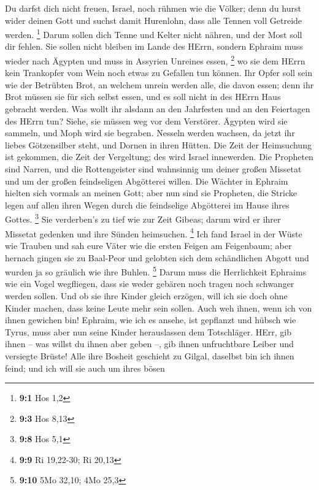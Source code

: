  Du darfst dich nicht freuen, Israel, noch rühmen wie die
Völker; denn du hurst wider deinen Gott und suchst damit Hurenlohn, dass
alle Tennen voll Getreide werden. \footnote{\textbf{9:1} Hos 1,2}
 Darum sollen dich Tenne und Kelter nicht nähren, und der
Most soll dir fehlen.  Sie sollen nicht bleiben im Lande des
HErrn, sondern Ephraim muss wieder nach Ägypten und muss in Assyrien
Unreines essen, \footnote{\textbf{9:3} Hos 8,13}  wo sie dem
HErrn kein Trankopfer vom Wein noch etwas zu Gefallen tun können. Ihr
Opfer soll sein wie der Betrübten Brot, an welchem unrein werden alle,
die davon essen; denn ihr Brot müssen sie für sich selbst essen, und es
soll nicht in des HErrn Haus gebracht werden.  Was wollt ihr
alsdann an den Jahrfesten und an den Feiertagen des HErrn tun?
 Siehe, sie müssen weg vor dem Verstörer. Ägypten wird sie
sammeln, und Moph wird sie begraben. Nesseln werden wachsen, da jetzt
ihr liebes Götzensilber steht, und Dornen in ihren Hütten. 
Die Zeit der Heimsuchung ist gekommen, die Zeit der Vergeltung; des wird
Israel innewerden. Die Propheten sind Narren, und die Rottengeister sind
wahnsinnig um deiner großen Missetat und um der großen feindseligen
Abgötterei willen.  Die Wächter in Ephraim hielten sich
vormals an meinen Gott; aber nun sind sie Propheten, die Stricke legen
auf allen ihren Wegen durch die feindselige Abgötterei im Hause ihres
Gottes. \footnote{\textbf{9:8} Hos 5,1}  Sie verderben's zu
tief wie zur Zeit Gibeas; darum wird er ihrer Missetat gedenken und ihre
Sünden heimsuchen. \footnote{\textbf{9:9} Ri 19,22-30; Ri 20,13}
 Ich fand Israel in der Wüste wie Trauben und sah eure
Väter wie die ersten Feigen am Feigenbaum; aber hernach gingen sie zu
Baal-Peor und gelobten sich dem schändlichen Abgott und wurden ja so
gräulich wie ihre Buhlen. \footnote{\textbf{9:10} 5Mo 32,10; 4Mo 25,3}
 Darum muss die Herrlichkeit Ephraims wie ein Vogel
wegfliegen, dass sie weder gebären noch tragen noch schwanger werden
sollen.  Und ob sie ihre Kinder gleich erzögen, will ich
sie doch ohne Kinder machen, dass keine Leute mehr sein sollen. Auch weh
ihnen, wenn ich von ihnen gewichen bin!  Ephraim, wie ich
es ansehe, ist gepflanzt und hübsch wie Tyrus, muss aber nun seine
Kinder herauslassen dem Totschläger.  HErr, gib ihnen --
was willst du ihnen aber geben --, gib ihnen unfruchtbare Leiber und
versiegte Brüste!  Alle ihre Bosheit geschieht zu Gilgal,
daselbst bin ich ihnen feind; und ich will sie auch um ihres bösen
